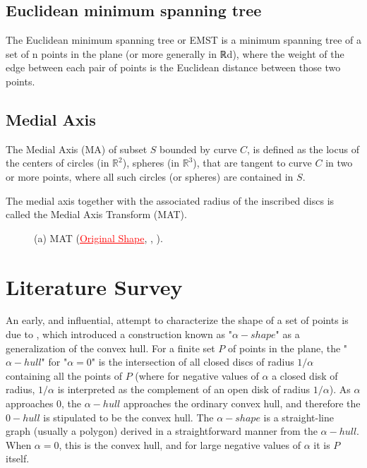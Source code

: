 \documentclass[12pt,a4paper]{article}
\begin{document}
\subsection{Euclidean minimum spanning tree}
The Euclidean minimum spanning tree or EMST is a minimum spanning tree of a set of n points in the plane (or more generally in ℝd), where the weight of the edge between each pair of points is the Euclidean distance between those two points.

\subsection{Medial Axis}
The Medial Axis (MA) of subset $S$ bounded by curve $C$, is defined as the locus of the centers of circles (in $\mathbb{R}^2$), spheres (in $\mathbb{R}^3$), that are tangent to curve $C$ in two or more points, where all such circles (or spheres) are contained in $S$.

The medial axis together with the associated radius of the inscribed discs is called the Medial Axis Transform (MAT).


\begin{figure}[!h]
	\centering
	\caption{
		(a) MAT (\textcolor{red}{\protect\uline{Original Shape}}, \textcolor{green}{\protect{}}, \textcolor{blue}{\protect{}}). 
	}
\end{figure}

\normalem
\section{Literature Survey}

An early, and influential, attempt to characterize the shape of a set of points is due to \cite{Edelsbrunner:2006:SSP:2263365.2270180}, which introduced a construction known as "$\alpha-shape$" as a generalization of the convex hull. For a finite set $P$ of points in the plane, the "$\alpha-hull$" for "$\alpha = 0$" is the intersection of all closed discs of radius $1/\alpha$ containing all the points of $P$ (where for negative values of $\alpha$ a closed disk of radius, $1/\alpha$ is interpreted as the complement of an open disk of radius $1/\alpha$). As $\alpha$ approaches 0, the $\alpha-hull$ approaches the ordinary convex hull, and therefore the $0-hull$ is stipulated to be the convex hull. The $\alpha-shape$ is a straight-line graph (usually a polygon) derived in a straightforward manner from the $\alpha-hull$. When $\alpha = 0$, this is the convex hull, and for large negative values of $\alpha$ it is $P$ itself.
\end{document}
